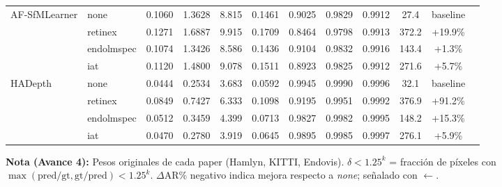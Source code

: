 \documentclass{article}
\begin{document}
\begin{table}[htbp]
\begin{tabular}{llccccccccc@{\hspace{12pt}}l}
AF-SfMLearner & none       & 0.1060 & 1.3628 & 8.815 & 0.1461 & 0.9025 & 0.9829 & 0.9912 &  27.4 & baseline & \\
              & retinex    & 0.1271 & 1.6887 & 9.915 & 0.1709 & 0.8464 & 0.9798 & 0.9913 & 372.2 & +19.9\%  & \\
              & endolmspec & 0.1074 & 1.3426 & 8.586 & 0.1436 & 0.9104 & 0.9832 & 0.9916 & 143.4 &  +1.3\%  & \\
              & iat        & 0.1120 & 1.4800 & 9.078 & 0.1511 & 0.8923 & 0.9825 & 0.9912 & 271.6 &  +5.7\%  & \\
\addlinespace[0.8em]

HADepth & none       & 0.0444 & 0.2534 & 3.683 & 0.0592 & 0.9945 & 0.9990 & 0.9996 &  32.1 & baseline & \\
        & retinex    & 0.0849 & 0.7427 & 6.333 & 0.1098 & 0.9195 & 0.9951 & 0.9992 & 376.9 & +91.2\%  & \\
        & endolmspec & 0.0512 & 0.3459 & 4.399 & 0.0713 & 0.9827 & 0.9982 & 0.9995 & 148.2 & +15.3\%  & \\
        & iat        & 0.0470 & 0.2780 & 3.919 & 0.0645 & 0.9895 & 0.9985 & 0.9997 & 276.1 &  +5.9\%  & \\
\bottomrule
\end{tabular}

\vspace{0.5em}
\begin{minipage}{\linewidth}
    \footnotesize
    \textbf{Nota (Avance 4):} Pesos originales de cada paper (Hamlyn, KITTI, Endovis). $\delta < 1.25^k$ = fracción de píxeles con $\max(\text{pred}/\text{gt}, \text{gt}/\text{pred}) < 1.25^k$. $\Delta\text{AR}\%$ negativo indica mejora respecto a \textit{none}; señalado con $\leftarrow$.
\end{minipage}

\end{table}
\end{document}
